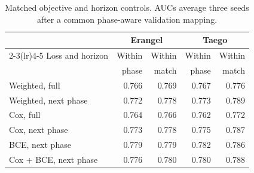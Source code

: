\begin{table}[t]
\centering\footnotesize
\caption{Matched objective and horizon controls. AUCs average three seeds after a common phase-aware validation mapping.}
\label{tab:objective}
\setlength{\tabcolsep}{3pt}
\begin{tabular}{lrrrr}
\toprule
 & \multicolumn{2}{c}{Erangel} & \multicolumn{2}{c}{Taego} \\
\cmidrule(lr){2-3}\cmidrule(lr){4-5}
Loss and horizon & Within & Within & Within & Within \\
 & phase & match & phase & match \\
\midrule
Weighted, full & 0.766 & 0.769 & 0.767 & 0.776 \\
Weighted, next phase & 0.772 & 0.778 & 0.773 & 0.789 \\
Cox, full & 0.764 & 0.766 & 0.762 & 0.772 \\
Cox, next phase & 0.773 & 0.778 & 0.775 & 0.787 \\
BCE, next phase & 0.779 & 0.779 & 0.782 & 0.786 \\
Cox + BCE, next phase & 0.776 & 0.780 & 0.780 & 0.788 \\
\bottomrule
\end{tabular}
\end{table}
